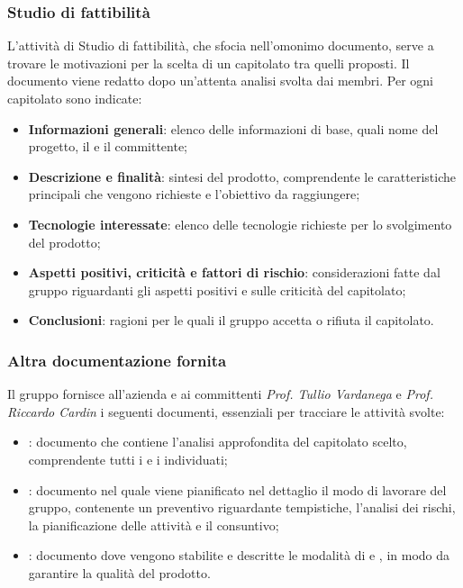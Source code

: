 \subsubsection{Studio di fattibilità}
L'attività di Studio di fattibilità, che sfocia nell'omonimo documento, serve a trovare le motivazioni per la scelta di un capitolato tra quelli proposti.
Il documento \SdF{} viene redatto dopo un'attenta analisi svolta dai membri.
Per ogni capitolato sono indicate:
\begin{itemize}
	\item \textbf{Informazioni generali}: elenco delle informazioni di base, quali nome del progetto, il  e il committente;
	\item \textbf{Descrizione e finalità}: sintesi del prodotto, comprendente le caratteristiche principali che vengono richieste e l'obiettivo da raggiungere;
	\item \textbf{Tecnologie interessate}: elenco delle tecnologie richieste per lo svolgimento del prodotto;
	\item \textbf{Aspetti positivi, criticità e fattori di rischio}: considerazioni fatte dal gruppo riguardanti gli aspetti positivi e sulle criticità del capitolato;
	\item \textbf{Conclusioni}: ragioni per le quali il gruppo accetta o rifiuta il capitolato.
\end{itemize}

\subsubsection{Altra documentazione fornita}

Il gruppo fornisce all'azienda \proponente{} e ai committenti \textit{Prof. Tullio Vardanega} e \textit{Prof. Riccardo Cardin} i seguenti documenti, essenziali per tracciare le attività svolte:
\begin{itemize}
	\item \textbf{\AdR{}}: documento che contiene l'analisi approfondita del capitolato scelto, comprendente tutti i  e i  individuati;
	\item \textbf{\PdP{}}: documento nel quale viene pianificato nel dettaglio il modo di lavorare del gruppo, contenente un preventivo riguardante tempistiche, l'analisi dei rischi, la pianificazione delle attività e il consuntivo;
	\item \textbf{\PdQ{}}: documento dove vengono stabilite e descritte le modalità di  e , in modo da garantire la qualità del prodotto.
\end{itemize}

